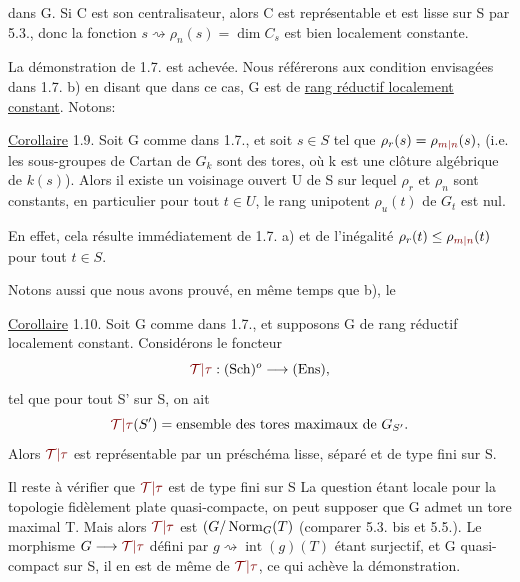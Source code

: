 dans G. Si C est son centralisateur, alors C est représentable et est
lisse sur S par  5.3., donc la fonction
$s\rightsquigarrow\rho_n(s)=\dim C_s$ est bien
localement constante.

La démonstration de 1.7. est achevée. Nous référerons aux
condition envisagées dans 1.7. b) en disant que dans ce cas, G est
de \uline{rang réductif localement constant}. Notons:

\uline{Corollaire} 1.9. Soit G comme dans 1.7., et soit $s\in S$ tel que
$\rho_r(s)=\rho_{\unsure{m|n}}(s)$, (i.e. les sous-groupes de Cartan de $G_k$ sont des tores, où k
est une clôture algébrique de $k(s)$). Alors il existe un voisinage 
ouvert U de S sur lequel $\rho_r$ et $\rho_n$ sont constants, en particulier pour
tout $t\in U$, le rang unipotent $\rho_u(t)$ de $G_t$ est nul.

En effet,  cela
résulte immédiatement de 1.7. a) et de l'inégalité $\rho_r(t)\le\rho_{\unsure{m|n}}(t)$ pour
tout $t\in S$.

Notons aussi que nous avons prouvé, en même temps que b), le

\uline{Corollaire} 1.10. Soit G comme dans 1.7., et supposons G de rang
réductif localement constant. Considérons le foncteur
\[
\unsure{\mathcal T|\tau}:(\mathrm{Sch})^o\longrightarrow(\mathrm{Ens}),
\]
tel que pour tout S' sur S, on ait
\[
\unsure{\mathcal T|\tau}(S')=\text{ensemble des tores maximaux de }G_{S'}.
\]
Alors $\unsure{\mathcal T|\tau}$ est représentable par un préschéma lisse, séparé et de
type fini sur S.

Il reste à vérifier que $\unsure{\mathcal T|\tau}$ est  de type fini sur S La
question étant locale pour la topologie fidèlement plate quasi-compacte,
on peut supposer que G admet un tore maximal T. Mais alors $\unsure{\mathcal T|\tau}$
 est
$(G/\operatorname{Norm}_G(T)$ (comparer  5.3. bis et 5.5.).
 Le morphisme
$G\longrightarrow\unsure{\mathcal T|\tau}$ défini par $g\rightsquigarrow\operatorname{int}(g)(T)$ étant surjectif,
et G quasi-compact
sur S, il en est de même de $\unsure{\mathcal T|\tau}$, ce qui achève la démonstration.

